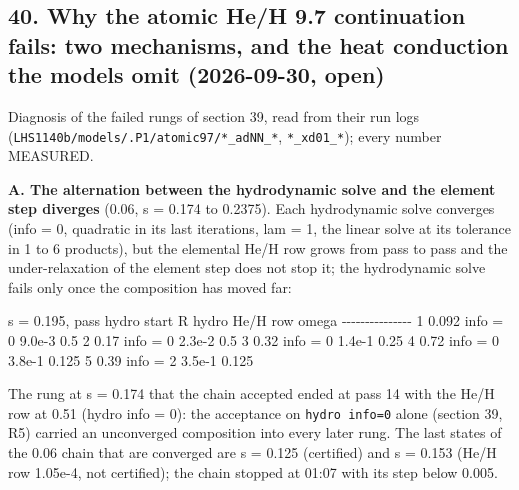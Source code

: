 \documentclass[english,a4paper]{my_memo}
\begin{document}
\subsection{40. Why the atomic He/H 9.7 continuation fails: two mechanisms, and the heat conduction the models omit (2026-09-30, open)}\label{40-why-the-atomic-heh-97-continuation-fails-two-mechanisms-and-the-heat-conduction-the-models-omit-2026-09-30-open}

Diagnosis of the failed rungs of section 39, read from their run logs
(\texttt{LHS1140b/models/.P1/atomic97/*\_adNN\_*}, \texttt{*\_xd01\_*}); every number
MEASURED.

\textbf{A. The alternation between the hydrodynamic solve and the element step
diverges} (0.06, s = 0.174 to 0.2375). Each hydrodynamic solve converges
(info = 0, quadratic in its last iterations, lam = 1, the linear solve at its
tolerance in 1 to 6 products), but the elemental He/H row grows from pass to
pass and the under-relaxation of the element step does not stop it; the
hydrodynamic solve fails only once the composition has moved far:

\textbar{} s = 0.195, pass \textbar{} hydro start \textbar\textbar R\textbar\textbar{} \textbar{} hydro \textbar{} He/H row \textbar{} omega \textbar{}
\textbar-\/-\/-\textbar-\/-\/-\textbar-\/-\/-\textbar-\/-\/-\textbar-\/-\/-\textbar{}
\textbar{} 1 \textbar{} 0.092 \textbar{} info = 0 \textbar{} 9.0e-3 \textbar{} 0.5 \textbar{}
\textbar{} 2 \textbar{} 0.17 \textbar{} info = 0 \textbar{} 2.3e-2 \textbar{} 0.5 \textbar{}
\textbar{} 3 \textbar{} 0.32 \textbar{} info = 0 \textbar{} 1.4e-1 \textbar{} 0.25 \textbar{}
\textbar{} 4 \textbar{} 0.72 \textbar{} info = 0 \textbar{} 3.8e-1 \textbar{} 0.125 \textbar{}
\textbar{} 5 \textbar{} 0.39 \textbar{} info = 2 \textbar{} 3.5e-1 \textbar{} 0.125 \textbar{}

The rung at s = 0.174 that the chain accepted ended at pass 14 with the
He/H row at 0.51 (hydro info = 0): the acceptance on \texttt{hydro\ info=0} alone
(section 39, R5) carried an unconverged composition into every later rung.
The last states of the 0.06 chain that are converged are s = 0.125
(certified) and s = 0.153 (He/H row 1.05e-4, not certified); the chain
stopped at 01:07 with its step below 0.005.
\end{document}
